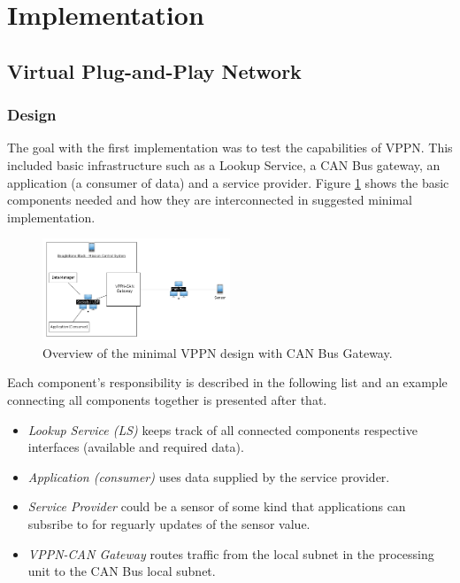 \section{Implementation}\label{sec:implementation}
\subsection{Virtual Plug-and-Play Network}
\subsubsection{Design}
The goal with the first implementation was to test the capabilities of VPPN.
This included basic infrastructure such as a Lookup Service, a CAN Bus
gateway, an application (a consumer of data) and a service provider. Figure
\ref{fig:vppn-overview} shows the basic components needed and how they are
interconnected in suggested minimal implementation.

\begin{figure}[h]
    \includegraphics[width=0.5\textwidth]{./figure/vppn-overview.png}
    \caption{Overview of the minimal VPPN design with CAN Bus Gateway.}
    \label{fig:vppn-overview}
\end{figure}

Each component's responsibility is described in the following list and an
example connecting all components together is presented after that.
\begin{itemize}
    \item {\em Lookup Service (LS)} keeps track of all connected components
        respective interfaces (available and required data).
    \item {\em Application (consumer)} uses data supplied by the service
        provider.
    \item {\em Service Provider} could be a sensor of some kind that
        applications can subsribe to for reguarly updates of the sensor value.
    \item {\em VPPN-CAN Gateway} routes traffic from the local subnet in the
        processing unit to the CAN Bus local subnet.
\end{itemize}


